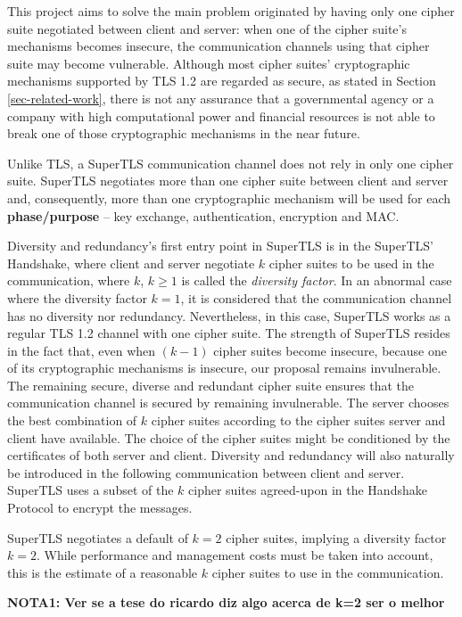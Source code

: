 \documentclass{sig-alternate-05-2015}
\begin{document}
This project aims to solve the main problem originated by having only one cipher suite negotiated between client and server: when one of the cipher suite's mechanisms becomes insecure, the communication channels using that cipher suite may become vulnerable.
Although most cipher suites' cryptographic mechanisms supported by TLS 1.2 are regarded as secure, as stated in Section \ref{sec-related-work}, there is not any assurance that a governmental agency or a company with high computational power and financial resources is not able to break one of those cryptographic mechanisms in the near future.

Unlike TLS, a SuperTLS communication channel does not rely in only one cipher suite. SuperTLS negotiates more than one cipher suite between client and server and, consequently, more than one cryptographic mechanism will be used for each \textbf{phase/purpose} -- key exchange, authentication, encryption and MAC.

Diversity and redundancy's first entry point in SuperTLS is in the SuperTLS' Handshake, where client and server negotiate $k$ cipher suites to be used in the communication, where $k$, $k\geq1$ is called the \textit{diversity factor}. In an abnormal case where the diversity factor $k = 1$, it is considered that the communication channel has no diversity nor redundancy. Nevertheless, in this case, SuperTLS works as a regular TLS 1.2 channel with one cipher suite.
The strength of SuperTLS resides in the fact that, even when $(k - 1)$ cipher suites become insecure, because one of its cryptographic mechanisms is insecure, our proposal remains invulnerable. The remaining secure, diverse and redundant cipher suite ensures that the communication channel is secured by remaining invulnerable.
The server chooses the best combination of $k$ cipher suites according to the cipher suites server and client have available. The choice of the cipher suites might be conditioned by the certificates of both server and client.
Diversity and redundancy will also naturally be introduced in the following communication between client and server. SuperTLS uses a subset of the $k$ cipher suites agreed-upon in the Handshake Protocol to encrypt the messages.

SuperTLS negotiates a default of $k = 2$ cipher suites, implying a diversity factor $k = 2$. While performance and management costs must be taken into account, this is the estimate of a reasonable $k$ cipher suites to use in the communication.

\textbf{NOTA1: Ver se a tese do ricardo diz algo acerca de k=2 ser o melhor}
\end{document}
